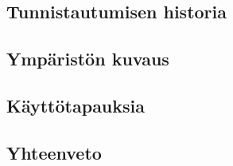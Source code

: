 
\subsection{Tunnistautumisen historia}

\subsection{Ympäristön kuvaus}

\subsection{Käyttötapauksia}

\subsection{Yhteenveto}

